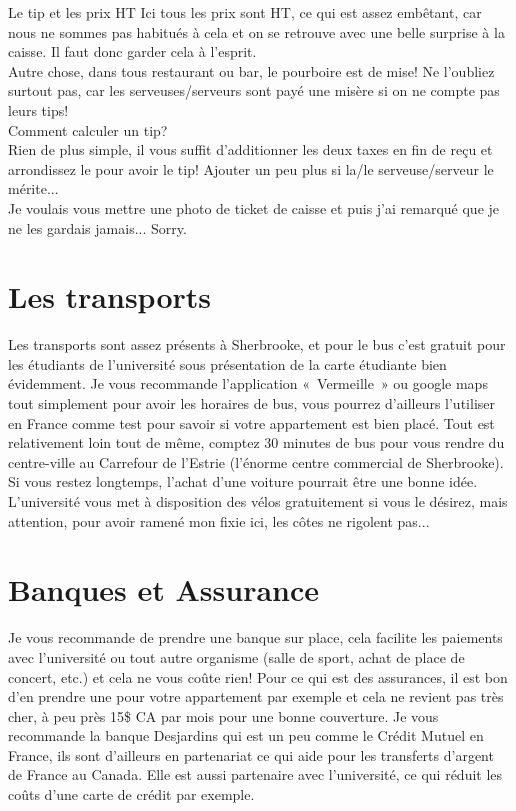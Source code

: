 \begin{example}{Le tip et les prix HT}
  Ici tous les prix sont HT, ce qui est assez embêtant, car nous ne sommes pas habitués à cela et on se retrouve avec une belle surprise à la caisse. Il faut donc garder cela à l’esprit. \\
  Autre chose, dans tous restaurant ou bar, le pourboire est de mise! Ne l’oubliez surtout pas, car les serveuses/serveurs sont payé une misère si on ne compte pas leurs tips!\\
  Comment calculer un tip? \\
  Rien de plus simple, il vous suffit d’additionner les deux taxes en fin de reçu et arrondissez le pour avoir le tip! Ajouter un peu plus si la/le serveuse/serveur le mérite... \\
  Je voulais vous mettre une photo de ticket de caisse et puis j'ai remarqué que je ne les gardais jamais... Sorry.
\end{example}


\section{Les transports}\label{sec:sec4.5}
Les transports sont assez présents à Sherbrooke, et pour le bus c’est gratuit pour les étudiants de l’université sous présentation de la carte étudiante bien évidemment. Je vous recommande l’application « Vermeille » ou google maps tout simplement pour avoir les horaires de bus, vous pourrez d’ailleurs l’utiliser en France comme test pour savoir si votre appartement est bien placé. Tout est relativement loin tout de même, comptez 30 minutes de bus pour vous rendre du centre-ville au Carrefour de l’Estrie (l’énorme centre commercial de Sherbrooke). Si vous restez longtemps, l’achat d’une voiture pourrait être une bonne idée.
L’université vous met à disposition des vélos gratuitement si vous le désirez, mais attention, pour avoir ramené mon fixie ici, les côtes ne rigolent pas...

\section{Banques et Assurance}\label{sec:sec4.6}
Je vous recommande de prendre une banque sur place, cela facilite les paiements avec l’université ou tout autre organisme (salle de sport, achat de place de concert, etc.) et cela ne vous coûte rien! Pour ce qui est des assurances, il est bon d’en prendre une pour votre appartement par exemple et cela ne revient pas très cher, à peu près 15\$ CA par mois pour une bonne couverture.
Je vous recommande la banque Desjardins qui est un peu comme le Crédit Mutuel en France, ils sont d’ailleurs en partenariat ce qui aide pour les transferts d’argent de France au Canada. Elle est aussi partenaire avec l’université, ce qui réduit les coûts d’une carte de crédit par exemple.

